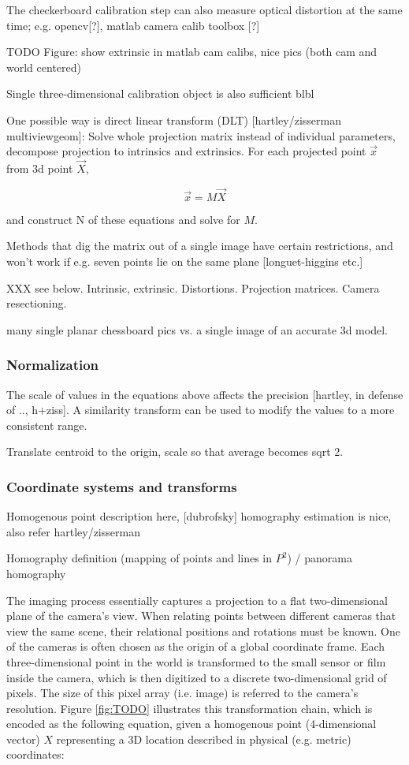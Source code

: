 The checkerboard calibration step can also measure optical distortion at the same time; e.g. opencv[?], matlab camera calib toolbox [?]

TODO Figure: show extrinsic in matlab cam calibs, nice pics (both cam and world centered)

Single three-dimensional calibration object is also sufficient blbl

One possible way is direct linear transform (DLT) [hartley/zisserman multiviewgeom]: Solve whole projection matrix instead of individual parameters, decompose projection to intrinsics and extrinsics. For each projected point $\vec x$ from 3d point $\vec X$,

\[
	\vec x = M \vec X
\]

and construct N of these equations and solve for $M$.

Methods that dig the matrix out of a single image have certain restrictions, and won't work if e.g. seven points lie on the same plane [longuet-higgins etc.]

XXX see below. Intrinsic, extrinsic. Distortions. Projection matrices. Camera resectioning.

many single planar chessboard pics vs. a single image of an accurate 3d model.

\subsubsection{Normalization}

The scale of values in the equations above affects the precision [hartley, in defense of .., h+ziss]. A similarity transform can be used to modify the values to a more consistent range.

Translate centroid to the origin, scale so that average becomes sqrt 2.


\subsubsection{Coordinate systems and transforms}

Homogenous point description here, [dubrofsky] homography estimation is nice, also refer hartley/zisserman

Homography definition (mapping of points and lines in $P^2$) / panorama homography

The imaging process essentially captures a projection to a flat two-dimensional plane of the camera's view.
When relating points between different cameras that view the same scene, their relational positions and rotations must be known.
One of the cameras is often chosen as the origin of a global coordinate frame.
Each three-dimensional point in the world is transformed to the small sensor or film inside the camera, which is then digitized to a discrete two-dimensional grid of pixels. The size of this pixel array (i.e. image) is referred to the camera's resolution.
Figure \ref{fig:TODO} illustrates this transformation chain, which is encoded as the following equation, given a homogenous point (4-dimensional vector) $X$ representing a 3D location described in physical (e.g. metric) coordinates:

